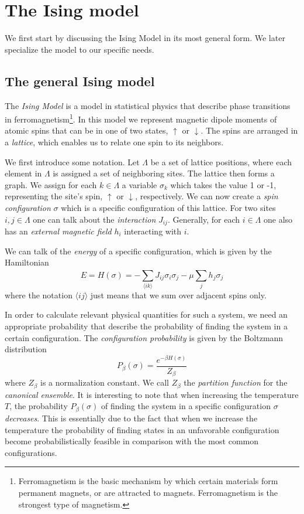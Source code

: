 \section{The Ising model}

We first start by discussing the Ising Model in its most general form. We later
specialize the model to our specific needs.

\subsection{The general Ising model}
The \emph{Ising Model} is a model in statistical physics that describe phase
transitions in ferromagnetism\footnote{Ferromagnetism is the basic mechanism by
which certain materials form permanent magnets, or are attracted to magnets.
Ferromagnetism is the strongest type of magnetism.}. In this model we represent
magnetic dipole moments of atomic spins that can be in one of two states,
$\uparrow$ or $\downarrow$. The spins are arranged in a \emph{lattice}, which
enables us to relate one spin to its neighbors.

We first introduce some notation. Let $\Lambda$ be a set of lattice positions,
where each element in $\Lambda$ is assigned a set of neighboring sites. The
lattice then forms a graph. We assign for each $k \in \Lambda$ a variable
$\sigma_k$ which takes the value 1 or -1, representing the site's spin,
$\uparrow$ or $\downarrow$, respectively. We can now create a \emph{spin
configuration} $\sigma$ which is a specific configuration of this lattice.  For
two sites $i, j \in \Lambda$ one can talk about the \emph{interaction}
$J_{ij}$. Generally, for each $i \in \Lambda$ one also has an \textit{external
magnetic field} $h_i$ interacting with $i$.

We can talk of the \emph{energy} of a specific configuration, which is given by
the Hamiltonian
\begin{equation}
  \label{eq:general ising model}
  E = H(\sigma) = - \sum^{}_{\langle i k\rangle} J_{ij}\sigma_i\sigma_j - \mu \sum^{}_{j} h_j\sigma_j
\end{equation}
where the notation $\langle i j \rangle$ just means that we sum over adjacent
spins only.

In order to calculate relevant physical quantities for such a system, we need
an appropriate probability that describe the probability of finding the system
in a certain configuration. The \emph{configuration probability} is given by
the Boltzmann distribution
\begin{equation}
  \label{eq:configuration probability}
  P_\beta(\sigma) = \frac{e^{-\beta H(\sigma)}}{Z_\beta}
\end{equation}
where $Z_\beta$ is a normalization constant. We call $Z_\beta$ the
\emph{partition function} for the \emph{canonical ensemble}. It is interesting
to note that when increasing the temperature $T$, the probability
$P_\beta(\sigma)$ of finding the system in a specific configuration $\sigma$
\emph{decreases}. This is essentially due to the fact that when we increase the
temperature the probability of finding states in an unfavorable configuration
become probabilistically feasible in comparison with the most common
configurations.

